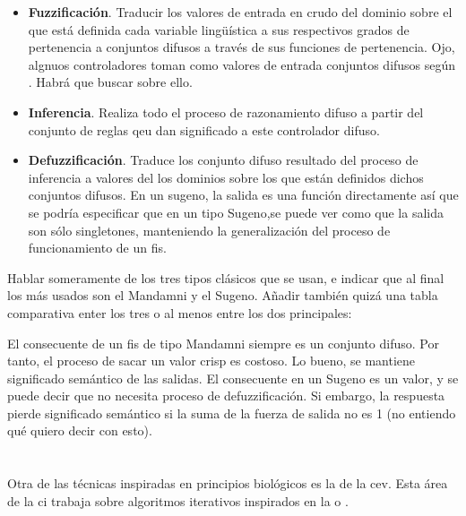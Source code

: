 \begin{itemize}
	\item \textbf{Fuzzificación}. Traducir los valores de entrada en crudo del dominio sobre el que está definida cada variable lingüística a sus respectivos grados de pertenencia a conjuntos difusos a través de sus funciones de pertenencia. \TODO Ojo, algnuos controladores toman como valores de entrada conjuntos difusos según \cite{Ma}. Habrá que buscar sobre ello.
	\item \textbf{Inferencia}. Realiza todo el proceso de razonamiento difuso a partir del conjunto de reglas qeu dan significado a este controlador difuso.
	\item \textbf{Defuzzificación}. Traduce los conjunto difuso resultado del proceso de inferencia a valores del los dominios sobre los que están definidos dichos conjuntos difusos. \TODO En un sugeno, la salida es una función directamente así que se podría especificar que en un tipo Sugeno,se puede ver como que la salida son sólo singletones, manteniendo la generalización del proceso de funcionamiento de un \ac{fis}.
\end{itemize}

Hablar someramente de los tres tipos clásicos que se usan, e indicar que al final los más usados son el Mandamni y el Sugeno. Añadir también quizá una tabla comparativa enter los tres o al menos entre los dos principales:

El consecuente de un \ac{fis} de tipo Mandamni siempre es un conjunto difuso. Por tanto, el proceso de sacar un valor crisp es costoso. Lo bueno, se mantiene significado semántico de las salidas. El consecuente en un Sugeno es un valor, y se puede decir que no necesita proceso de defuzzificación. Si embargo, la respuesta pierde significado semántico si la suma de la fuerza de salida no es 1 (no entiendo qué quiero decir con esto).

\section{}

Otra de las técnicas inspiradas en principios biológicos es la de la \gls{cev}. Esta área de la \gls{ci} trabaja sobre algoritmos iterativos inspirados en la  o .

